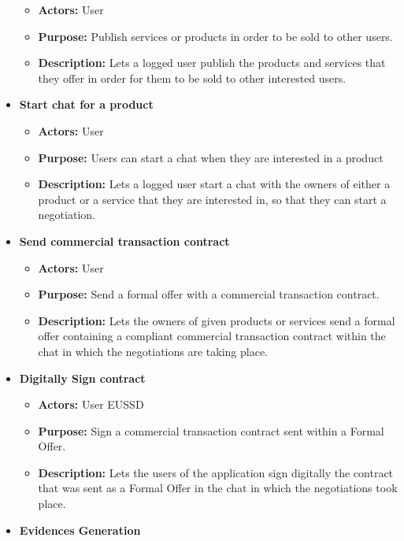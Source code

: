 \documentclass[./main.tex]{subfiles}
\begin{document}
\begin{itemize}
\begin{itemize}
  \item
    \textbf{Actors:} User
  \item
    \textbf{Purpose:} Publish services or products in order to be sold
    to other users.
  \item
    \textbf{Description:} Lets a logged user publish the products and
    services that they offer in order for them to be sold to other
    interested users.
  \end{itemize}
\item
  \textbf{Start chat for a product}

  \begin{itemize}
  
  \item
    \textbf{Actors:} User
  \item
    \textbf{Purpose:} Users can start a chat when they are interested in
    a product
  \item
    \textbf{Description:} Lets a logged user start a chat with the
    owners of either a product or a service that they are interested in,
    so that they can start a negotiation.
  \end{itemize}
\item
  \textbf{Send commercial transaction contract}

  \begin{itemize}
  
  \item
    \textbf{Actors:} User
  \item
    \textbf{Purpose:} Send a formal offer with a commercial transaction
    contract.
  \item
    \textbf{Description:} Lets the owners of given products or services
    send a formal offer containing a compliant commercial transaction
    contract within the chat in which the negotiations are taking place.
  \end{itemize}
\item
  \textbf{Digitally Sign contract}

  \begin{itemize}
  
  \item
    \textbf{Actors:} User EUSSD
  \item
    \textbf{Purpose:} Sign a commercial transaction contract sent within
    a Formal Offer.
  \item
    \textbf{Description:} Lets the users of the application sign
    digitally the contract that was sent as a Formal Offer in the chat
    in which the negotiations took place.
  \end{itemize}
\item
  \textbf{Evidences Generation}


\end{itemize}
\end{document}

